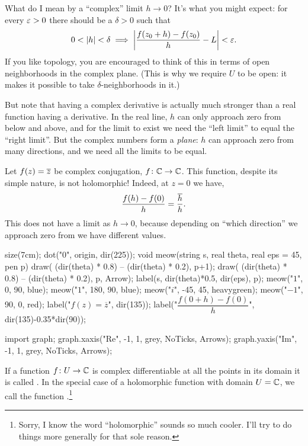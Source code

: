 What do I mean by a ``complex'' limit $h \to 0$?
It's what you might expect: for every $\varepsilon > 0$ there should be a $\delta > 0$
such that
\[ 0 < \left\lvert h \right\rvert < \delta
	\implies
	\left\lvert \frac{f(z_0+h)-f(z_0)}{h} - L \right\rvert < \varepsilon. \]
If you like topology, you are encouraged to think of this in terms of
open neighborhoods in the complex plane.
(This is why we require $U$ to be open:
it makes it possible to take $\delta$-neighborhoods in it.)

But note that having a complex derivative is actually much stronger
than a real function having a derivative.
In the real line, $h$ can only approach zero from below and above,
and for the limit to exist we need the ``left limit'' to equal the ``right limit''.
But the complex numbers form a \emph{plane}: $h$ can approach zero
from many directions, and we need all the limits to be equal.

\begin{example}
	Let $f(z) = \overline z$ be complex conjugation, $f \colon \mathbb C \to \mathbb C$.
	This function, despite its simple nature, is not holomorphic!
	Indeed, at $z=0$ we have,
	\[ \frac{f(h)-f(0)}{h} = \frac{\overline h}{h}. \]
	This does not have a limit as $h \to 0$, because depending
	on ``which direction'' we approach zero from we have different values.
	\begin{center}
		\begin{asy}
			size(7cm);
			dot("$0$", origin, dir(225));
			void meow(string s, real theta, real eps = 45, pen p) {
				draw( (dir(theta) * 0.8) -- (dir(theta) * 0.2), p+1);
				draw( (dir(theta) * 0.8) -- (dir(theta) * 0.2), p, Arrow);
				label(s, dir(theta)*0.5, dir(eps), p);
			}
			meow("$1$", 0, 90, blue);
			meow("$1$", 180, 90, blue);
			meow("$i$", -45, 45, heavygreen);
			meow("$-1$", 90, 0, red);
			label("$f(z) = \overline z$", dir(135));
			label("$\dfrac{f(0+h)-f(0)}{h}$", dir(135)-0.35*dir(90));

			import graph;
			graph.xaxis("Re", -1, 1, grey, NoTicks, Arrows);
			graph.yaxis("Im", -1, 1, grey, NoTicks, Arrows);
		\end{asy}
	\end{center}
\end{example}

If a function $f \colon U \to \mathbb C$ is complex differentiable
at all the points in its domain it is called .
In the special case of a holomorphic function with domain $U = \mathbb C$,
we call the function .\footnote{Sorry, I know the word ``holomorphic'' sounds so much cooler. I'll try to do things more generally for that sole reason.}

